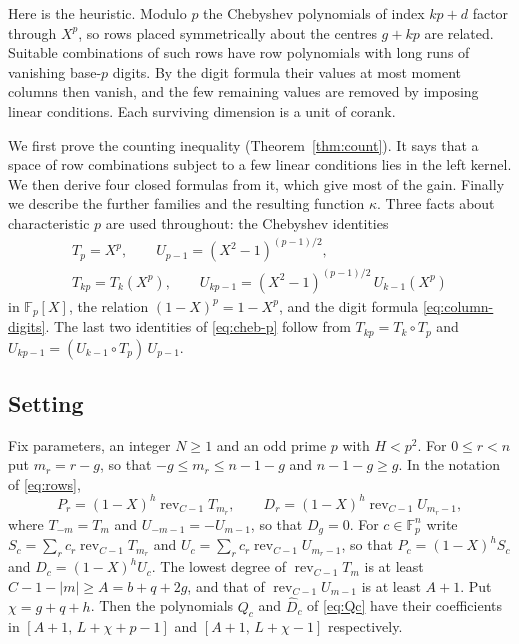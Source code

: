 \documentclass[11pt]{amsart}
\theoremstyle{definition}
\theoremstyle{remark}
\numberwithin{equation}{section}
\newcommand{\F}{\mathbb F}
\begin{document}
Here is the heuristic. Modulo $p$ the Chebyshev polynomials of index $kp+d$ factor through $X^p$, so rows
placed symmetrically about the centres $g+kp$ are related. Suitable combinations of such rows have row
polynomials with long runs of vanishing base-$p$ digits. By the digit formula their values at most moment
columns then vanish, and the few remaining values are removed by imposing linear conditions. Each surviving
dimension is a unit of corank.

We first prove the counting inequality (Theorem~\ref{thm:count}). It says that a space of row combinations
subject to a few linear conditions lies in the left kernel. We then derive four closed formulas from it,
which give most of the gain. Finally we describe the further families and the resulting function $\kappa$.
Three facts about characteristic $p$ are used throughout: the Chebyshev identities
\begin{equation}\label{eq:cheb-p}
 \begin{gathered}
 T_p=X^p,\qquad U_{p-1}=(X^2-1)^{(p-1)/2},\\
 T_{kp}=T_k(X^p),\qquad U_{kp-1}=(X^2-1)^{(p-1)/2}\,U_{k-1}(X^p)
 \end{gathered}
\end{equation}
in $\F_p[X]$, the relation $(1-X)^p=1-X^p$, and the digit formula \eqref{eq:column-digits}. The last two
identities of \eqref{eq:cheb-p} follow from $T_{kp}=T_k\circ T_p$ and $U_{kp-1}=(U_{k-1}\circ T_p)\,U_{p-1}$.

\subsection{Setting}
Fix parameters, an integer $N\ge1$ and an odd prime $p$ with $H<p^2$. For $0\le r<n$ put $m_r=r-g$, so that
$-g\le m_r\le n-1-g$ and $n-1-g\ge g$. In the notation of \eqref{eq:rows},
\[
 P_r=(1-X)^h\operatorname{rev}_{C-1}T_{m_r},\qquad D_r=(1-X)^h\operatorname{rev}_{C-1}U_{m_r-1},
\]
where $T_{-m}=T_m$ and $U_{-m-1}=-U_{m-1}$, so that $D_g=0$. For $c\in\F_p^n$ write
$S_c=\sum_rc_r\operatorname{rev}_{C-1}T_{m_r}$ and $U_c=\sum_rc_r\operatorname{rev}_{C-1}U_{m_r-1}$, so that
$P_c=(1-X)^hS_c$ and $D_c=(1-X)^hU_c$. The lowest degree of $\operatorname{rev}_{C-1}T_m$ is at least
$C-1-|m|\ge A=b+q+2g$, and that of $\operatorname{rev}_{C-1}U_{m-1}$ is at least $A+1$. Put $\chi=g+q+h$. Then
the polynomials $Q_c$ and $\widehat D_c$ of \eqref{eq:Qc} have their coefficients in $[A+1,\,L+\chi+p-1]$
and $[A+1,\,L+\chi-1]$ respectively.
\end{document}

